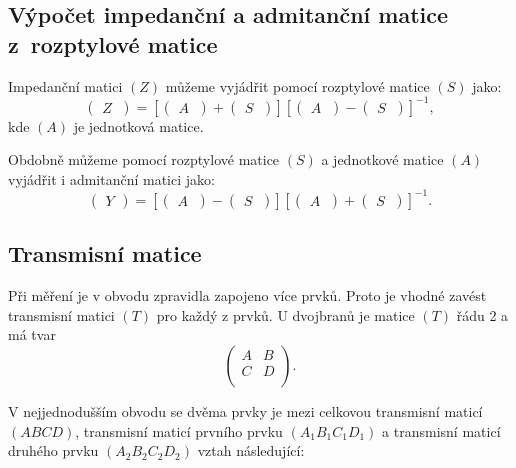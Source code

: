 \documentclass{protokol}
\begin{document}
\subsection{Výpočet impedanční a admitanční matice z~rozptylové matice}

Impedanční matici $(Z)$ můžeme vyjádřit pomocí rozptylové matice $(S)$ jako:
\[
\begin{pmatrix}
	Z~\end{pmatrix}
=
[\begin{pmatrix}
	A~\end{pmatrix}
+
\begin{pmatrix}
	S~\end{pmatrix}]
%
[\begin{pmatrix}
	A~\end{pmatrix}
-
\begin{pmatrix}
	S~\end{pmatrix}]^{-1}
,\]
kde $(A)$ je jednotková matice.
\bigskip

Obdobně můžeme pomocí rozptylové matice $(S)$ a jednotkové matice $(A)$
vyjádřit i admitanční matici jako:
\[
\begin{pmatrix}
	Y
\end{pmatrix}
=
[\begin{pmatrix}
	A~\end{pmatrix}
-
\begin{pmatrix}
	S~\end{pmatrix}]
%
[\begin{pmatrix}
	A~\end{pmatrix}
+
\begin{pmatrix}
	S~\end{pmatrix}]^{-1}
.\]

\subsection{Transmisní matice}
Při měření je v obvodu zpravidla zapojeno více prvků.
Proto je vhodné zavést transmisní matici $(T)$ pro každý z prvků.
U dvojbranů je matice $(T)$ řádu 2 a má tvar
\[
\begin{pmatrix}
	A & B  \\
	C &	D  \\
\end{pmatrix}
.\]

V nejjednodušším obvodu se dvěma prvky je mezi celkovou transmisní
maticí $(ABCD)$, transmisní maticí prvního prvku $(A_1B_1C_1D_1)$
a transmisní maticí druhého prvku $(A_2B_2C_2D_2)$ vztah následující:
\end{document}
